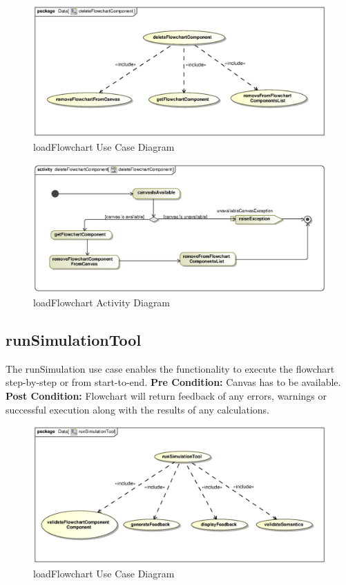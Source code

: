 \documentclass[11pt,a4paper,titlepage]{article}
\begin{document}
\begin{figure}[H]
  \centering
\includegraphics[width=500px]{deleteFlowchartComponentUseCase.eps}
\caption{loadFlowchart Use Case Diagram}
\end{figure}

\begin{figure}[H]
  \centering
\includegraphics[width=500px]{deleteFlowchartComponentActivity.eps}
\caption{loadFlowchart Activity Diagram}
\end{figure}

\newpage
\subsection{runSimulationTool}
The runSimulation use case enables the functionality to execute the flowchart step-by-step or from start-to-end.\newline\newline
\textbf{Pre Condition:} Canvas has to be available.\newline\newline
\textbf{Post Condition:} Flowchart will return feedback of any errors, warnings or successful execution along with the results of any calculations.

\begin{figure}[H]
  \centering
\includegraphics[width=500px]{runSimulationToolUseCase.eps}
\caption{loadFlowchart Use Case Diagram}
\end{figure}
\end{document}
